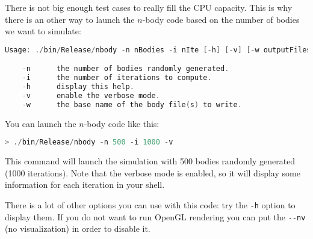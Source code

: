 There is not big enough test cases to really fill the CPU capacity. 
This is why there is an other way to launch the $n$-body code based on the number of bodies we want to simulate:
\begin{lstlisting}[language=c]
Usage: ./bin/Release/nbody -n nBodies -i nIte [-h] [-v] [-w outputFiles]

	-n		the number of bodies randomly generated.
	-i		the number of iterations to compute.
	-h		display this help.
	-v		enable the verbose mode.
	-w		the base name of the body file(s) to write.
\end{lstlisting}
You can launch the $n$-body code like this:
\begin{lstlisting}[language=c]
> ./bin/Release/nbody -n 500 -i 1000 -v
\end{lstlisting}
This command will launch the simulation with 500 bodies randomly generated (1000 iterations). Note that the verbose mode is enabled, so it will display some information for each iteration in your shell.

There is a lot of other options you can use with this code: try the \texttt{-h} option to display them.
If you do not want to run OpenGL rendering you can put the \texttt{-\--nv} (no visualization) in order to disable it.